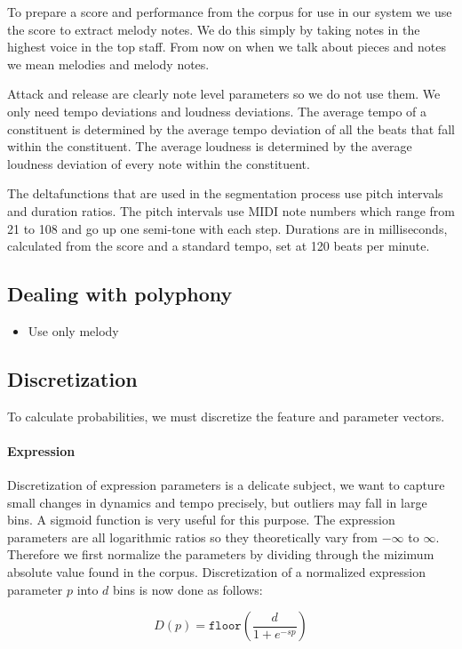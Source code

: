 \documentclass[a4paper,10pt]{article}
\begin{document}
To prepare a score and performance from the corpus for use in our system we use the score to extract melody notes. We do this simply by taking notes in the highest voice in the top staff. From now on when we talk about pieces and notes we mean melodies and melody notes.

Attack and release are clearly note level parameters so we do not use them. We only need tempo deviations and loudness deviations. The average tempo of a constituent is determined by the average tempo deviation of all the beats that fall within the constituent. The average loudness is determined by the average loudness deviation of every note within the constituent.

The deltafunctions that are used in the segmentation process use pitch intervals and duration ratios. The pitch intervals use MIDI note numbers which range from 21 to 108 and go up one semi-tone with each step. Durations are in milliseconds, calculated from the score and a standard tempo, set at 120 beats per minute.


\subsection{Dealing with polyphony}
\begin{itemize}
\item Use only melody
\end{itemize}
\subsection{Discretization}
To calculate probabilities, we must discretize the feature and parameter vectors.

\paragraph*{Expression} Discretization of expression parameters is a delicate subject, we want to capture small changes in dynamics and tempo precisely, but outliers may fall in large bins. A sigmoid function is very useful for this purpose. The expression parameters are all logarithmic ratios so they theoretically vary from $-\infty$ to $\infty$. Therefore we first normalize the parameters by dividing through the mizimum absolute value found in the corpus. Discretization of a normalized expression parameter $p$ into $d$ bins is now done as follows:

\begin{equation}
D(p) = \texttt{floor}\left(\frac{d}{1+e^{-sp}}\right)
\end{equation}
\end{document}
